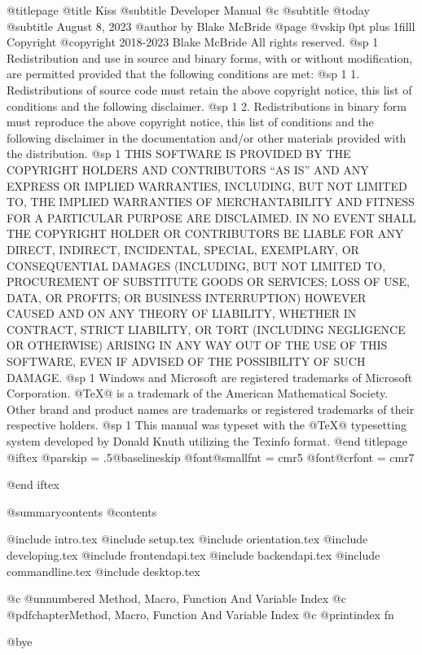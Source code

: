 @titlepage
@title Kiss
@subtitle Developer Manual
@c @subtitle @today{}
@subtitle August 8, 2023
@author by Blake McBride
@page
@vskip 0pt plus 1filll
Copyright  @copyright{} 2018-2023 Blake McBride
All rights reserved.
@sp 1
Redistribution and use in source and binary forms, with or without
modification, are permitted provided that the following conditions are
met:
@sp 1
1. Redistributions of source code must retain the above copyright
notice, this list of conditions and the following disclaimer.
@sp 1
2. Redistributions in binary form must reproduce the above copyright
notice, this list of conditions and the following disclaimer in the
documentation and/or other materials provided with the distribution.
@sp 1
THIS SOFTWARE IS PROVIDED BY THE COPYRIGHT HOLDERS AND CONTRIBUTORS
``AS IS'' AND ANY EXPRESS OR IMPLIED WARRANTIES, INCLUDING, BUT NOT
LIMITED TO, THE IMPLIED WARRANTIES OF MERCHANTABILITY AND FITNESS FOR
A PARTICULAR PURPOSE ARE DISCLAIMED. IN NO EVENT SHALL THE COPYRIGHT
HOLDER OR CONTRIBUTORS BE LIABLE FOR ANY DIRECT, INDIRECT, INCIDENTAL,
SPECIAL, EXEMPLARY, OR CONSEQUENTIAL DAMAGES (INCLUDING, BUT NOT
LIMITED TO, PROCUREMENT OF SUBSTITUTE GOODS OR SERVICES; LOSS OF USE,
DATA, OR PROFITS; OR BUSINESS INTERRUPTION) HOWEVER CAUSED AND ON ANY
THEORY OF LIABILITY, WHETHER IN CONTRACT, STRICT LIABILITY, OR TORT
(INCLUDING NEGLIGENCE OR OTHERWISE) ARISING IN ANY WAY OUT OF THE USE
OF THIS SOFTWARE, EVEN IF ADVISED OF THE POSSIBILITY OF SUCH DAMAGE.
@sp 1
Windows and Microsoft are registered trademarks of
Microsoft Corporation.  @TeX{}@ is a trademark of the American
Mathematical Society. Other brand and product names are trademarks or
registered trademarks of their respective holders.
@sp 1
This manual was typeset with the @TeX{}@ typesetting system developed by
Donald Knuth utilizing the Texinfo format.
@end titlepage
@iftex
@parskip = .5@baselineskip
@font@smallfnt = cmr5
@font@crfont = cmr7

@end iftex

@summarycontents
@contents

@include intro.tex
@include setup.tex
@include orientation.tex
@include developing.tex
@include frontendapi.tex
@include backendapi.tex
@include commandline.tex
@include desktop.tex

@c @unnumbered Method, Macro, Function And Variable Index
@c @pdfchapter{Method, Macro, Function And Variable Index}
@c @printindex fn

@bye

